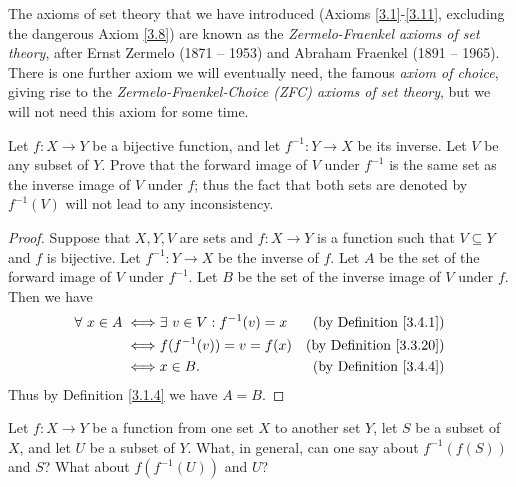 \setcounter{theorem}{11}
\begin{remark}\label{3.4.12}
    The axioms of set theory that we have introduced (Axioms \ref{3.1}-\ref{3.11}, excluding the dangerous Axiom \ref{3.8}) are known as the \emph{Zermelo-Fraenkel axioms of set theory}, after Ernst Zermelo (1871 -- 1953) and Abraham Fraenkel (1891 -- 1965).
    There is one further axiom we will eventually need, the famous \emph{axiom of choice}, giving rise to the \emph{Zermelo-Fraenkel-Choice (ZFC) axioms of set theory}, but we will not need this axiom for some time.
\end{remark}

\exercisesection

\begin{exercise}\label{ex 3.4.1}
    Let \(f : X \to Y\) be a bijective function, and let \(f^{-1} : Y \to X\) be its inverse.
    Let \(V\) be any subset of \(Y\).
    Prove that the forward image of \(V\) under \(f^{-1}\) is the same set as the inverse image of \(V\) under \(f\);
    thus the fact that both sets are denoted by \(f^{-1}(V)\) will not lead to any inconsistency.
\end{exercise}

\begin{proof}
    Suppose that \(X, Y, V\) are sets and \(f : X \to Y\) is a function such that \(V \subseteq Y\) and \(f\) is bijective.
    Let \(f^{-1} : Y \to X\) be the inverse of \(f\).
    Let \(A\) be the set of the forward image of \(V\) under \(f^{-1}\).
    Let \(B\) be the set of the inverse image of \(V\) under \(f\).
    Then we have
    \begin{align*}
        \forall\ x \in A \iff & \exists\ v \in V : f^{-1}(v) = x & \text{(by Definition \ref{3.4.1})}  \\
        \iff                  & f(f^{-1}(v)) = v = f(x)          & \text{(by Definition \ref{3.3.20})} \\
        \iff                  & x \in B.                         & \text{(by Definition \ref{3.4.4})}
    \end{align*}
    Thus by Definition \ref{3.1.4} we have \(A = B\).
\end{proof}

\begin{exercise}\label{ex 3.4.2}
    Let \(f : X \to Y\) be a function from one set \(X\) to another set \(Y\), let \(S\) be a subset of \(X\), and let \(U\) be a subset of \(Y\).
    What, in general, can one say about \(f^{-1}(f(S))\) and \(S\)?
    What about \(f(f^{-1}(U))\) and \(U\)?
\end{exercise}

